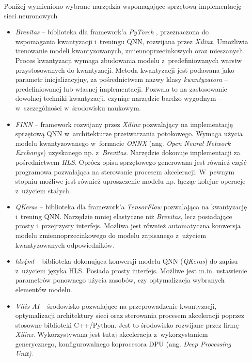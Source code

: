 Poniżej wymieniono wybrane narzędzia wspomagające sprzętową implementację sieci neuronowych
\begin{itemize}
    \item \emph{Brevitas}\cite{brevitas} -- biblioteka dla framework'a \emph{PyTorch} \cite{pytorch}, przeznaczona do wspomagania kwantyzacji i~treningu QNN, rozwijana przez \emph{Xilinx}. Umożliwia trenowanie modeli kwantyzowanych, zmiennoprzecinkowych oraz mieszanych. Proces kwantyzacji wymaga zbudowania modelu z~predefiniowanych warstw przystosowanych do kwantyzacji. 
    Metoda kwantyzacji jest podawana jako parametr inicjalizacyjny, za pośrednictwem nazwy klasy \emph{kwantyzatora} -- predefiniowanej lub własnej implementacji. 
    Pozwala to na zastosowanie dowolnej techniki kwantyzacji, czyniąc narzędzie bardzo wygodnym -- w~szczególności w~środowisku naukowym.
    
    \item \emph{FINN}\cite{finn} -- framework rozwijany przez \emph{Xilinx} pozwalający na implementację sprzętową QNN w~architekturze przetwarzania potokowego. 
    Wymaga użycia modelu kwantyzowanego w~formacie \emph{ONNX} (ang. \emph{Open Neural Network Exchange}) uzyskanego np. z~\emph{Brevitas}.
    Narzędzie dokonuje implementacji za pośrednictwem \emph{HLS}. Oprócz opisu sprzętowego generowana jest również część programowa pozwalająca na sterowanie procesem akceleracji. 
    W~pewnym stopniu możliwe jest również uproszczenie modelu np. łącząc kolejne operacje z~użyciem stałych. 
    
    
    \item \emph{QKeras}\cite{qkeras} -- biblioteka dla framework'a \emph{TensorFlow}\cite{tf} pozwalająca na kwantyzację i~trening QNN. Narzędzie mniej elastyczne niż \emph{Brevitas}, lecz posiadające prosty i~przejrzysty interfejs. 
    Możliwa jest również automatyczna konwersja modelu zmiennoprzecinkowego do modelu zapisanego z~użyciem kwantyzowanych odpowiedników.
    
    \item \emph{hls4ml}\cite{hls4ml} -- biblioteka dokonująca konwersji modelu QNN (\emph{QKeras}) do zapisu z~użyciem języka HLS.
    Posiada prosty interfejs. 
    Możliwe jest m.in. ustawienie parametrów ponownego użycia zasobów, czy optymalizacja wybranych elementów modelu. 
    
    \item \emph{Vitis AI}\cite{vitis_ai} -- środowisko pozwalające na przeprowadzenie kwantyzacji, optymalizacji architektury sieci oraz sterowania procesem akceleracji poprzez stosowne biblioteki C++/Python. Jest to środowisko rozwijane przez firmę \emph{Xilinx}.
    Wykorzystywana jest tutaj akceleracja z~wykorzystaniem generycznego, konfigurowalnego koprocesora DPU (ang.\textit{ Deep Processing Unit)}. 
    
\end{itemize}


